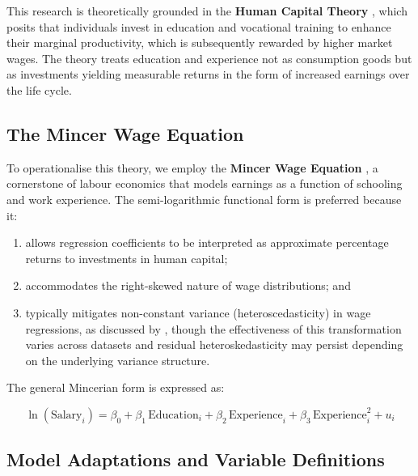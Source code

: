 \documentclass[12pt, a4paper]{article}
\begin{document}
This research is theoretically grounded in the \textbf{Human Capital Theory}
\citep{becker1964}, which posits that individuals invest in education and vocational
training to enhance their marginal productivity, which is subsequently rewarded by higher
market wages. The theory treats education and experience not as consumption goods but as
investments yielding measurable returns in the form of increased earnings over the life
cycle.

\subsection{The Mincer Wage Equation}

To operationalise this theory, we employ the \textbf{Mincer Wage Equation}
\citep{mincer1974}, a cornerstone of labour economics that models earnings as a function
of schooling and work experience. The semi-logarithmic functional form is preferred
because it:
\begin{enumerate}[label=(\roman*), leftmargin=2em]
  \item allows regression coefficients to be interpreted as approximate percentage
        returns to investments in human capital;
  \item accommodates the right-skewed nature of wage distributions; and
  \item typically mitigates non-constant variance (heteroscedasticity) in wage regressions, as discussed by \citet{wooldridge2010}, though the effectiveness of this transformation varies across datasets and residual heteroskedasticity may persist depending on the underlying variance structure.
\end{enumerate}

The general Mincerian form is expressed as:

\begin{equation}
  \ln(\text{Salary}_i) = \beta_0 + \beta_1\,\text{Education}_i
    + \beta_2\,\text{Experience}_i
    + \beta_3\,\text{Experience}_i^2
    + u_i
  \label{eq:mincer}
\end{equation}

\subsection{Model Adaptations and Variable Definitions}
\end{document}
